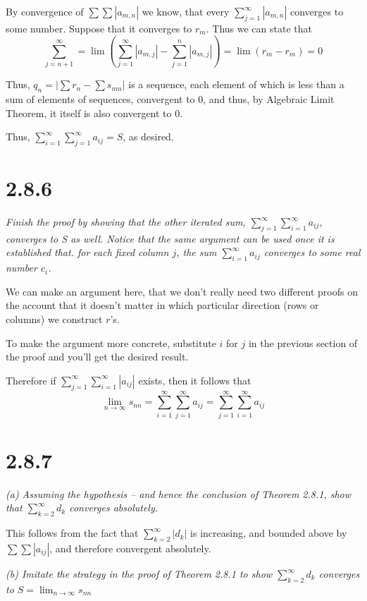 \documentclass[11pt,oneside,titlepage]{article}
\begin{document}
By convergence of $\sum \sum |a_{m,n}|$ we know, that every
$\sum_{j = 1}^{\infty} |a_{m,n}|$
converges to some number. Suppose that it converges to $r_m$. 
Thus we can state that
$$\sum_{j = n + 1}^{\infty} = \lim(\sum_{j = 1}^{\infty} |a_{m,j}| - \sum_{j = 1}^{n} |a_{m,j}|) = \lim(r_m - r_m) = 0$$

Thus, $q_n = \left|\sum r_n - \sum s_{mn}\right|$ is a sequence,
each element of which is less than a sum of elements of sequences,
convergent to 0, and thus, by Algebraic Limit Theorem, it itself
is also convergent to 0.

Thus,   $\sum_{i=1}^{\infty}\sum_{j=1}^{\infty} a_{ij} = S$, as desired.

\section*{2.8.6}
\textit{Finish the proof by showing that the other iterated sum, $\sum_{j=1}^{\infty}\sum_{i=1}^{\infty} a_{ij}$, converges to S as well. Notice that the
  same argument can be used once it is established that. for each fixed column
  $j$, the sum $\sum_{i = 1}^{\infty} a_{ij}$ converges to some real number
  $c_i$.}

We can make an argument here, that we don't really need two different proofs
on the account that it doesn't matter in which particular direction (rows or
columns) we construct $r$'s.

To make the argument more concrete, substitute $i$ for $j$  in the
previous section of the proof and you'll get the desired result.

Therefore if $\sum_{j = 1}^{\infty}\sum_{i = 1}^{\infty}|a_{ij}|$ exists,
then it follows that 
$$\lim_{n \to \infty} s_{nn} = \sum_{i = 1}^{\infty}\sum_{j = 1}^{\infty}a_{ij} = \sum_{j = 1}^{\infty}\sum_{i = 1}^{\infty}a_{ij}$$

\section*{2.8.7}
\textit{(a) Assuming the hypothesis -- and hence the conclusion of
  Theorem 2.8.1, show that $\sum_{k = 2}^{\infty}d_k$ converges absolutely.}

This follows from the fact that $\sum_{k = 2}^{\infty}|d_k|$ is increasing, and bounded
above by $\sum \sum |a_{ij}|$, and therefore convergent absolutely.

\textit{(b) Imitate the strategy in the proof of Theorem 2.8.1 to show
  $\sum_{k=2}^{\infty} d_k$ converges to $S = \lim_{n \to \infty}s_{nn}$}
\end{document}
